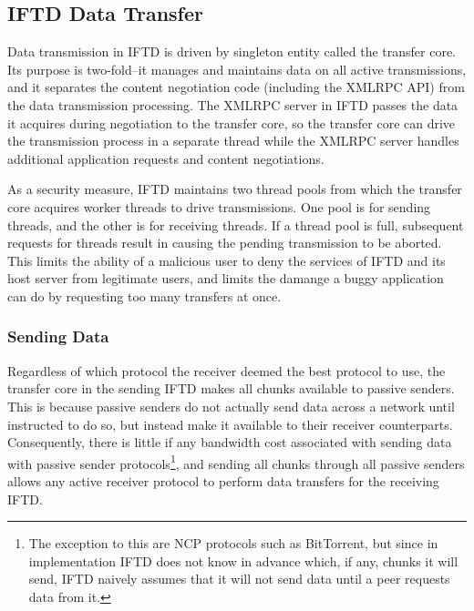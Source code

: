 \subsection{IFTD Data Transfer}

Data transmission in IFTD is driven by singleton entity called the transfer core.  Its purpose is two-fold--it manages and maintains data on all active transmissions, and it separates the content negotiation code (including the XMLRPC API) from the data transmission processing.  The XMLRPC server in IFTD passes the data it acquires during negotiation to the transfer core, so the transfer core can drive the transmission process in a separate thread while the XMLRPC server handles additional application requests and content negotiations.

As a security measure, IFTD maintains two thread pools from which the transfer core acquires worker threads to drive transmissions.  One pool is for sending threads, and the other is for receiving threads.  If a thread pool is full, subsequent requests for threads result in causing the pending transmission to be aborted.  This limits the ability of a malicious user to deny the services of IFTD and its host server from legitimate users, and limits the damange a buggy application can do by requesting too many transfers at once.

\subsubsection{Sending Data}

Regardless of which protocol the receiver deemed the best protocol to use, the transfer core in the sending IFTD makes all chunks available to passive senders.  This is because passive senders do not actually send data across a network until instructed to do so, but instead make it available to their receiver counterparts.  Consequently, there is little if any bandwidth cost associated with sending data with passive sender protocols\footnote[2]{The exception to this are NCP protocols such as BitTorrent, but since in implementation IFTD does not know in advance which, if any, chunks it will send, IFTD naively assumes that it will not send data until a peer requests data from it.}, and sending all chunks through all passive senders allows any active receiver protocol to perform data transfers for the receiving IFTD.

